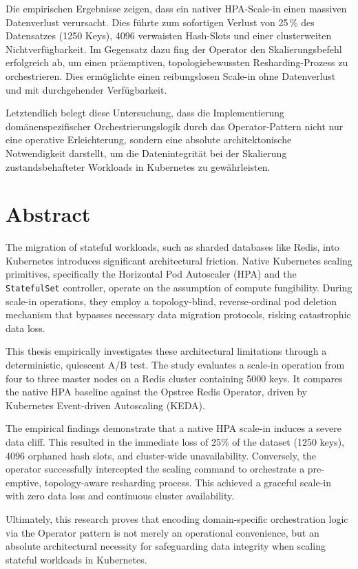 \documentclass[12pt,a4paper]{report}
\begin{document}
Die empirischen Ergebnisse zeigen, dass ein nativer HPA-Scale-in einen massiven Datenverlust verursacht. Dies führte zum sofortigen Verlust von 25\,\% des Datensatzes (\num{1250} Keys), \num{4096} verwaisten Hash-Slots und einer clusterweiten Nichtverfügbarkeit. Im Gegensatz dazu fing der Operator den Skalierungsbefehl erfolgreich ab, um einen präemptiven, topologiebewussten Resharding-Prozess zu orchestrieren. Dies ermöglichte einen reibungslosen Scale-in ohne Datenverlust und mit durchgehender Verfügbarkeit.

Letztendlich belegt diese Untersuchung, dass die Implementierung domänenspezifischer Orchestrierungslogik durch das Operator-Pattern nicht nur eine operative Erleichterung, sondern eine absolute architektonische Notwendigkeit darstellt, um die Datenintegrität bei der Skalierung zustandsbehafteter Workloads in Kubernetes zu gewährleisten.
\newpage
{}
\section*{Abstract}
The migration of stateful workloads, such as sharded databases like Redis, into Kubernetes introduces significant architectural friction. Native Kubernetes scaling primitives, specifically the Horizontal Pod Autoscaler (HPA) and the \texttt{StatefulSet} controller, operate on the assumption of compute fungibility. During scale-in operations, they employ a topology-blind, reverse-ordinal pod deletion mechanism that bypasses necessary data migration protocols, risking catastrophic data loss.

This thesis empirically investigates these architectural limitations through a deterministic, quiescent A/B test. The study evaluates a scale-in operation from four to three master nodes on a Redis cluster containing \num{5000} keys. It compares the native HPA baseline against the Opstree Redis Operator, driven by Kubernetes Event-driven Autoscaling (KEDA).

The empirical findings demonstrate that a native HPA scale-in induces a severe data cliff. This resulted in the immediate loss of 25\% of the dataset (\num{1250} keys), \num{4096} orphaned hash slots, and cluster-wide unavailability. Conversely, the operator successfully intercepted the scaling command to orchestrate a pre-emptive, topology-aware resharding process. This achieved a graceful scale-in with zero data loss and continuous cluster availability.

Ultimately, this research proves that encoding domain-specific orchestration logic via the Operator pattern is not merely an operational convenience, but an absolute architectural necessity for safeguarding data integrity when scaling stateful workloads in Kubernetes.
\end{document}
